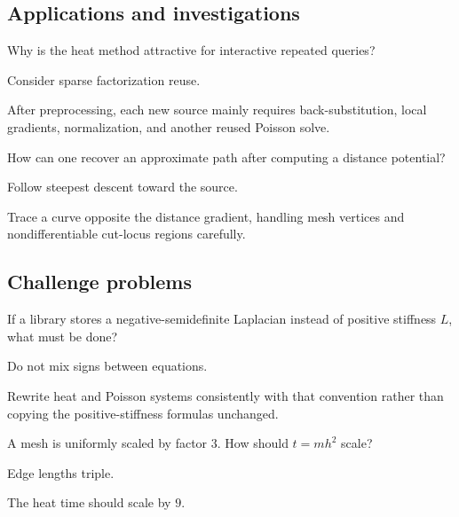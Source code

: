 \subsection*{Applications and investigations}

\begin{exercise}\label{exr:vii40-ped-13}
Why is the heat method attractive for interactive repeated queries?
\end{exercise}

\begin{hint}
Consider sparse factorization reuse.
\end{hint}

\begin{solution}
After preprocessing, each new source mainly requires back-substitution, local gradients, normalization, and another reused Poisson solve.
\end{solution}

\begin{exercise}\label{exr:vii40-ped-14}
How can one recover an approximate path after computing a distance potential?
\end{exercise}

\begin{hint}
Follow steepest descent toward the source.
\end{hint}

\begin{solution}
Trace a curve opposite the distance gradient, handling mesh vertices and nondifferentiable cut-locus regions carefully.
\end{solution}

\subsection*{Challenge problems}

\begin{exercise}\label{exr:vii40-ped-15}
If a library stores a negative-semidefinite Laplacian instead of positive stiffness \(L\), what must be done?
\end{exercise}

\begin{hint}
Do not mix signs between equations.
\end{hint}

\begin{solution}
Rewrite heat and Poisson systems consistently with that convention rather than copying the positive-stiffness formulas unchanged.
\end{solution}

\begin{exercise}\label{exr:vii40-ped-16}
A mesh is uniformly scaled by factor \(3\).  How should \(t=mh^2\) scale?
\end{exercise}

\begin{hint}
Edge lengths triple.
\end{hint}

\begin{solution}
The heat time should scale by \(9\).
\end{solution}

